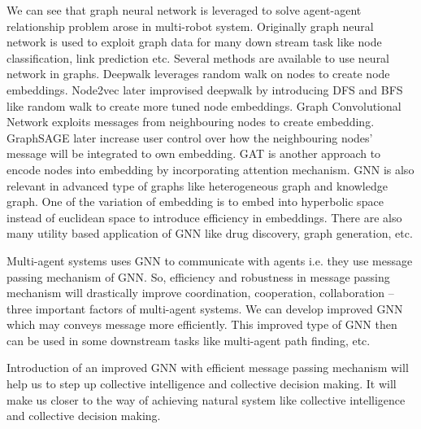 \documentclass[serif,professionalfont]{article}
\begin{document}
We can see that graph neural network is leveraged to solve agent-agent relationship problem arose in multi-robot system. Originally graph neural network is used to exploit graph data for many down stream task like node classification, link prediction etc. Several methods are available to use neural network in graphs. Deepwalk\cite{deepwalk} leverages random walk on nodes to create node embeddings. Node2vec\cite{node2vec} later improvised deepwalk\cite{deepwalk} by introducing DFS and BFS like random walk to create more tuned node embeddings. Graph Convolutional Network\cite{gcn} exploits messages from neighbouring nodes to create embedding. GraphSAGE\cite{graphsage} later increase user control over how the neighbouring nodes' message will be integrated to own embedding. GAT\cite{gat} is another approach to encode nodes into embedding by incorporating attention mechanism. GNN is also relevant in advanced type of graphs like heterogeneous graph\cite{HeterogeneousMultiRobotReinforcementLearning} and knowledge graph. One of the variation of embedding is to embed into hyperbolic space instead of euclidean space to introduce efficiency in embeddings. There are also many utility based application of GNN like drug discovery, graph generation, etc.

Multi-agent systems uses GNN to communicate with agents i.e. they use message passing mechanism of GNN. So, efficiency and robustness in message passing mechanism will drastically improve coordination, cooperation, collaboration -- three important factors of multi-agent systems. We can develop improved GNN which may conveys message more efficiently. This improved type of GNN then can be used in some downstream tasks like multi-agent path finding, etc.

Introduction of an improved GNN with efficient message passing mechanism will help us to step up collective intelligence and collective decision making. It will make us closer to the way of achieving natural system like collective intelligence and collective decision making.
\newpage



\end{document}
